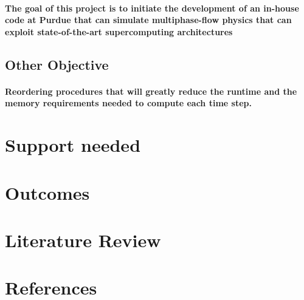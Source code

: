 \documentclass{article}
\begin{document}
	\paragraph{The goal of this project is to initiate the development of an in-house code at Purdue that can simulate multiphase-flow physics that can exploit state-of-the-art supercomputing architectures}
          \subsection{Other Objective}
	\paragraph{Reordering procedures that will greatly reduce the runtime and the memory requirements needed to compute each time step.}
	
\section{Support needed}

\section{Outcomes}
	\section{Literature Review}
	\section{References}
\end{document}
